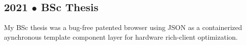 \subsection{2021 $\bullet$ BSc Thesis}
My BSc thesis was a bug-free patented browser using JSON as a containerized aynchronous template component layer for hardware rich-client optimization.
